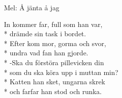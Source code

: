 \begin{SongText}
    \begin{SongInfo}
        Mel: Å jänta å jag
    \end{SongInfo}
    \begin{SongVerse}
        In kommer far, full som han var,\\*%
        drämde sin task i bordet.\\*%
        Efter kom mor, gorma och svor,\\*%
        undra vad fan han gjorde.\\*%
        -Ska du förstöra pillevicken din\\*%
        som du ska köra upp i muttan min?\\*%
        Katten han sket, ungarna skrek\\*%
        och farfar han stod och runka.
    \end{SongVerse}
\end{SongText}
